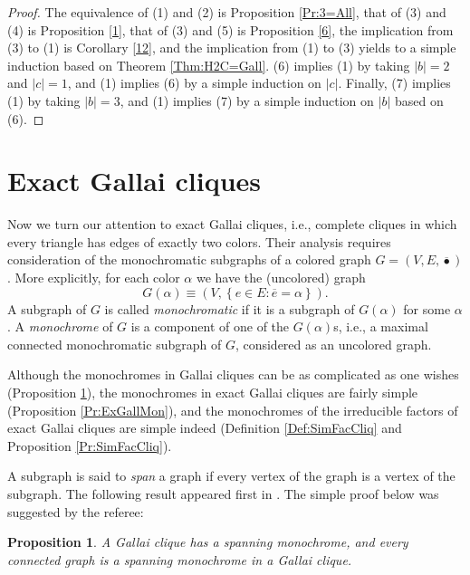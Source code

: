 \documentclass[12pt]{amsart}
\theoremstyle{plain}
\newtheorem{proposition}[theorem]{Proposition}
\numberwithin{equation}{section}
\begin{document}
\begin{proof}
The equivalence of (1) and (2) is Proposition \ref{Pr:3=All}, that of (3) and (4) is
Proposition \ref{1}, that of (3) and (5) is Proposition \ref{6}, the
implication from (3) to (1) is Corollary \ref{12}, and the implication from
(1) to (3) yields to a simple induction based on Theorem \ref{Thm:H2C=Gall}.
(6) implies (1) by taking $\left\vert b\right\vert =2$ and $\left\vert
c\right\vert =1$, and (1) implies (6) by a simple induction on $\left\vert
c\right\vert $. Finally, (7) implies (1) by taking $\left\vert b\right\vert
=3$, and (1) implies (7) by a simple induction on $\left\vert b\right\vert $
based on (6).
\end{proof}


\section{Exact Gallai cliques\label{Sec:ExGallCliq}}

Now we turn our attention to exact Gallai cliques, i.e., complete cliques in
which every triangle has edges of exactly two colors. Their analysis requires
consideration of the monochromatic subgraphs of a colored graph $G=\left(
V,E,\overline{\bullet}\right)  $. More explicitly, for each color $\alpha$ we
have the (uncolored) graph
\begin{displaymath}
    G\left(  \alpha\right)  \equiv\left(  V,\left\{  e\in E:\overline{e}
    =\alpha\right\}  \right)  .
\end{displaymath}
A subgraph of $G$ is called \emph{monochromatic} if it is a subgraph of
$G\left(  \alpha\right)  $ for some $\alpha$. A \emph{monochrome} of $G$ is a
component of one of the $G\left(  \alpha\right)  $s, i.e., a maximal
connected monochromatic subgraph of $G$, considered as an uncolored graph.

Although the monochromes in Gallai cliques can be as complicated as one wishes
(Proposition \ref{Pr:GallMon}), the monochromes in exact Gallai cliques are
fairly simple (Proposition \ref{Pr:ExGallMon}), and the monochromes of the
irreducible factors of exact Gallai cliques are simple indeed (Definition
\ref{Def:SimFacCliq} and Proposition \ref{Pr:SimFacCliq}).

A subgraph is said to \emph{span} a graph if every vertex of the graph is a
vertex of the subgraph. The following result appeared first in
\cite{Gallai:1967}. The simple proof below was suggested by the referee:

\begin{proposition}
\label{Pr:GallMon}A Gallai clique has a spanning monochrome, and every
connected graph is a spanning monochrome in a Gallai clique.
\end{proposition}
\end{document}
